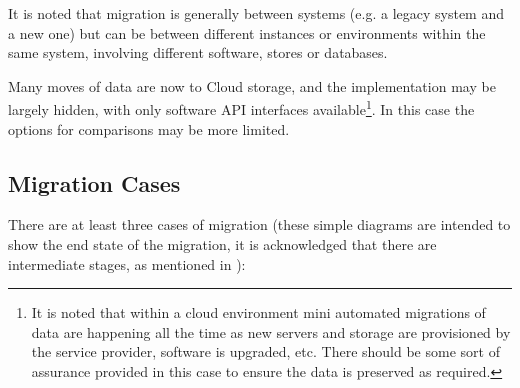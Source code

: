 It is noted that migration is generally between systems
(e.g. a legacy system and a new one) but can be between different instances or environments within the same system,
involving different software, stores or databases.

Many moves of data are now to Cloud storage, and the implementation may be largely hidden,
with only software API interfaces available\footnote{It is noted that within a cloud environment mini automated migrations of data are happening all the time as new servers and storage are provisioned by the service provider, software is upgraded, etc. There should be some sort of assurance provided in this case to ensure the data is preserved as required.}.
In this case the options for comparisons may be more limited.
%
\subsection{Migration Cases}
%
There are at least three cases of migration (these simple diagrams are intended to show the end state of the migration, it is acknowledged that there are intermediate stages, as mentioned in ):
